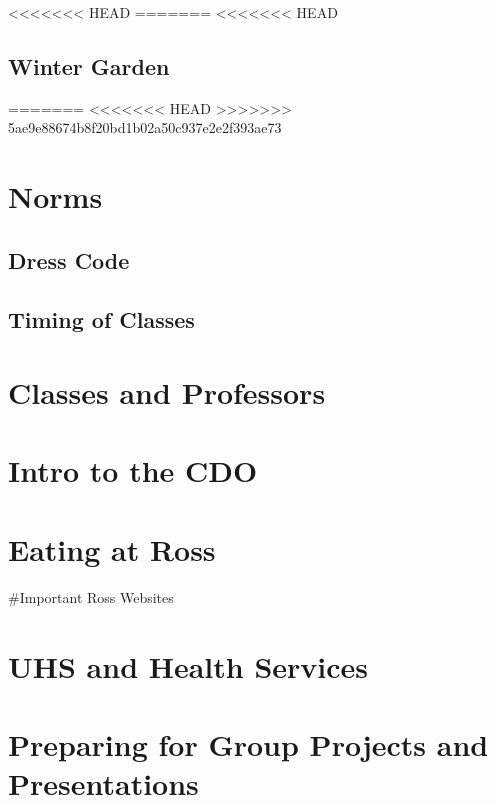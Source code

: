 \documentclass[
]{book}
\begin{document}
<<<<<<< HEAD
=======
<<<<<<< HEAD
\hypertarget{winter-garden}{%
\section{Winter Garden}\label{winter-garden}}
=======
<<<<<<< HEAD
>>>>>>> 5ae9e88674b8f20bd1b02a50c937e2e2f393ae73
\hypertarget{norms}{%
\chapter{Norms}\label{norms}}

\hypertarget{dress-code}{%
\section{Dress Code}\label{dress-code}}

\hypertarget{timing-of-classes}{%
\section{Timing of Classes}\label{timing-of-classes}}

\hypertarget{classes-and-professors}{%
\chapter{Classes and Professors}\label{classes-and-professors}}

\hypertarget{intro-to-the-cdo}{%
\chapter{Intro to the CDO}\label{intro-to-the-cdo}}

\hypertarget{eating-at-ross}{%
\chapter{Eating at Ross}\label{eating-at-ross}}

\#Important Ross Websites

\hypertarget{uhs-and-health-services}{%
\chapter{UHS and Health Services}\label{uhs-and-health-services}}

\hypertarget{preparing-for-group-projects-and-presentations}{%
\chapter{Preparing for Group Projects and Presentations}\label{preparing-for-group-projects-and-presentations}}
\end{document}
